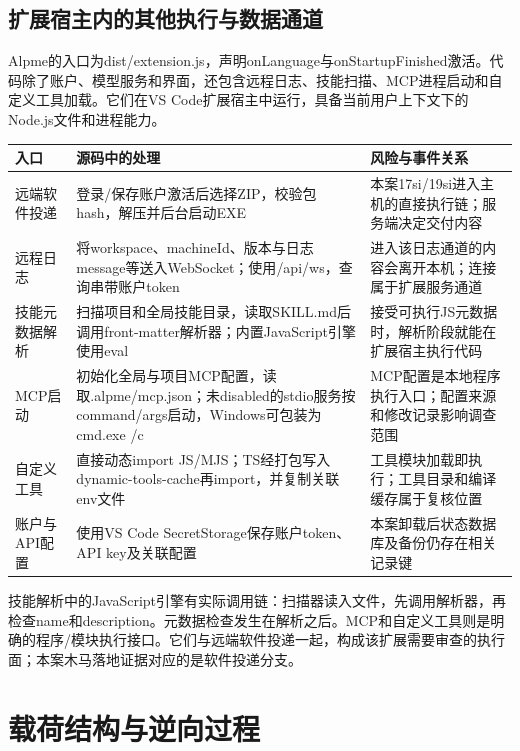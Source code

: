 \documentclass[UTF8,a4paper,zihao=5,fontset=windows]{ctexart}
\newcommand{\code}[1]{{\ttfamily\small #1}}
\begin{document}
\subsection{扩展宿主内的其他执行与数据通道}
Alpme的入口为\code{dist/extension.js}，声明\code{onLanguage}与\code{onStartupFinished}激活。代码除了账户、模型服务和界面，还包含远程日志、技能扫描、MCP进程启动和自定义工具加载。它们在VS Code扩展宿主中运行，具备当前用户上下文下的Node.js文件和进程能力。

\begin{longtable}{@{}L{27mm}L{77mm}L{46mm}@{}}\toprule 入口 & 源码中的处理 & 风险与事件关系\\\midrule\endhead
远端软件投递 & 登录/保存账户激活后选择ZIP，校验包hash，解压并后台启动EXE & 本案17si/19si进入主机的直接执行链；服务端决定交付内容\\
远程日志 & 将workspace、machineId、版本与日志message等送入WebSocket；使用\code{/api/ws}，查询串带账户token & 进入该日志通道的内容会离开本机；连接属于扩展服务通道\\
技能元数据解析 & 扫描项目和全局技能目录，读取\code{SKILL.md}后调用front-matter解析器；内置JavaScript引擎使用\code{eval} & 接受可执行JS元数据时，解析阶段就能在扩展宿主执行代码\\
MCP启动 & 初始化全局与项目MCP配置，读取\code{.alpme/mcp.json}；未disabled的stdio服务按command/args启动，Windows可包装为\code{cmd.exe /c} & MCP配置是本地程序执行入口；配置来源和修改记录影响调查范围\\
自定义工具 & 直接动态import JS/MJS；TS经打包写入\code{dynamic-tools-cache}再import，并复制关联env文件 & 工具模块加载即执行；工具目录和编译缓存属于复核位置\\
账户与API配置 & 使用VS Code SecretStorage保存账户token、API key及关联配置 & 本案卸载后状态数据库及备份仍存在相关记录键\\\bottomrule\end{longtable}

技能解析中的JavaScript引擎有实际调用链：扫描器读入文件，先调用解析器，再检查name和description。元数据检查发生在解析之后。MCP和自定义工具则是明确的程序/模块执行接口。它们与远端软件投递一起，构成该扩展需要审查的执行面；本案木马落地证据对应的是软件投递分支。

\section{载荷结构与逆向过程}
\label{sec:reverse}
\end{document}
